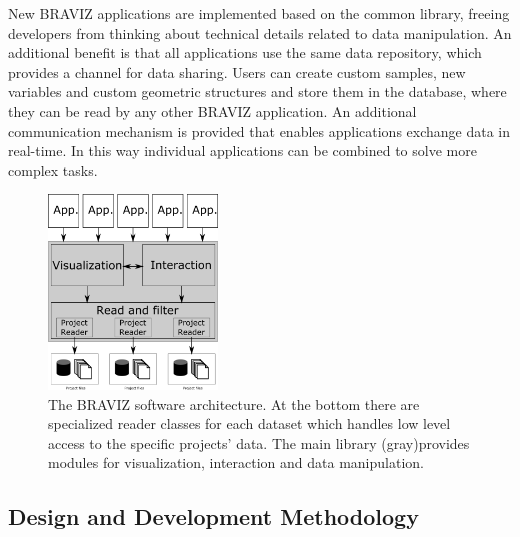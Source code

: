 \documentclass[twocolumn]{svjour3} %
\begin{document}
New BRAVIZ applications are implemented based on the common library, freeing developers from thinking about technical details related to data manipulation. An additional benefit is that all applications use the same data repository, which provides a channel for data sharing. Users can create custom samples, new variables and custom geometric structures and store them in the database, where they can be read by any other BRAVIZ application. An additional communication mechanism is provided that enables applications exchange data in real-time. In this way individual applications can be combined to solve more complex tasks.

\begin{figure}
\begin{center}
\includegraphics[width=0.4\textwidth]{figures/arquitecture.png}
\end{center}
 \caption{\label{fig_arch} The BRAVIZ software architecture. At the bottom there are specialized reader classes for each dataset which handles low level access to the specific projects' data. The main library (gray)provides modules for visualization, interaction and data manipulation. }
\end{figure}


\subsection{Design and Development Methodology}
\end{document}

